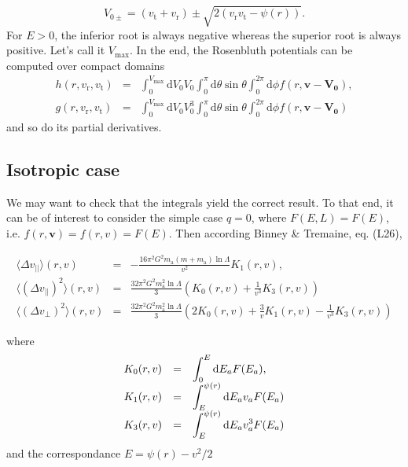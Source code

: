 \documentclass[11pt]{article}
\newcommand{\rt}{\mathrm{t}}
\newcommand{\rr}{\mathrm{r}}
\newcommand{\ra}{\mathrm{a}}
\newcommand{\vr}{v_{\rr}}
\newcommand{\vt}{v_{\rt}}
\newcommand{\bv}{\boldsymbol{v}}
\newcommand{\dvPar}{\Delta v_{||}}
\newcommand{\dvPerp}{\Delta v_{\perp}}
\newcommand{\dvParAvrLoc}{\langle \dvPar \rangle}
\newcommand{\dvParSqAvrLoc}{\langle(\dvPar)^{2}\rangle}
\newcommand{\dvPerpSqAvrLoc}{\langle(\dvPerp)^{2}\rangle}
\newcommand{\ma}{m_{\ra}}
\newcommand{\bV}[1]{\boldsymbol{V_{#1}}}
\newcommand{\rd}{{\mathrm{d}}}
\newcommand{\Vmax}{V_{\max}}
\begin{document}
\begin{equation}
  V_{0 \pm} = (\vt+\vr)\pm\sqrt{2(\vr\vt-\psi(r))}.
  \label{eq:Vmax}
\end{equation}
For $E>0$, the inferior root is always negative whereas the superior root is always positive. Let's call it $\Vmax$. In the end, the Rosenbluth potentials can be computed over compact domains
\begin{equation}
  \boxed{
\begin{array}{ccl}
  h(r,\vr,\vt) &=& \displaystyle{\int_{0}^{\Vmax}{\rd}V_{0} V_{0}\int_{0}^{\pi}{\rd}\theta\sin\theta\int_{0}^{2\pi}{\rd}\phi f(r,\bv-\bV0)} ,\\
  g(r,\vr,\vt) &=& \displaystyle{\int_{0}^{\Vmax}{\rd}V_{0} V_{0}^{3}\int_{0}^{\pi}{\rd}\theta\sin\theta\int_{0}^{2\pi}{\rd}\phi f(r,\bv-\bV0)}
\end{array}
}
\label{eq:Rosenbluth_finite}
\end{equation}
and so do its partial derivatives.

\subsection{Isotropic case}
\label{subsec:Isotropic}

We may want to check that the integrals yield the correct result.
To that end, it can be of interest to consider the simple case $q=0$,
where $F(E,L)=F(E)$, i.e. $f(r,\bv)=f(r,v)=F(E)$.
Then according Binney \& Tremaine, eq. (L26),

\begin{equation}
\begin{array}{ccl}
  \dvParAvrLoc(r,v) & =&\displaystyle{-\frac{16\pi^{2}G^{2}\ma(m+\ma)\ln\Lambda}{v^{2}}K_{1}(r,v)} ,\\
  
  \dvParSqAvrLoc(r,v) & = &\displaystyle{\frac{32\pi^{2}G^{2}\ma^{2}\ln\Lambda}{3}\left(K_{0}(r,v)+\frac{1}{v^{3}}K_{3}(r,v)\right)}\\
  
  \dvPerpSqAvrLoc(r,v) & = &\displaystyle{\frac{32\pi^{2}G^{2}\ma^{2}\ln\Lambda}{3}\left(2K_{0}(r,v)+\frac{3}{v}K_{1}(r,v)-\frac{1}{v^{3}}K_{3}(r,v)\right)}   
\end{array}
\label{eq:IsoLocDiffCoefsdRdT}
\end{equation}

where
\begin{equation}
\begin{array}{ccl}
 K_{0}(r,v) & =&\displaystyle{\int_{0}^{E}{\rm d}E_{a}F(E_{a})} ,\\
  
  K_{1}(r,v) & = &\displaystyle{\int_{E}^{\psi(r)}{\rm d}E_{a}v_{a}F(E_{a})}\\
  
  K_{3}(r,v) & = &\displaystyle{\int_{E}^{\psi(r)}{\rm d}E_{a}v_{a}^{3}F(E_{a})}   
\end{array}
\label{eq:K_Iso}
\end{equation}
and the correspondance $E = \psi(r)-v^{2}/2$
\end{document}
